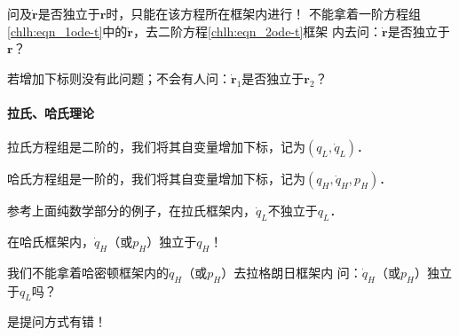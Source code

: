 问及$\dot{\boldsymbol{r}}$是否独立于$\boldsymbol{r}$时，只能在该方程所在框架内进行！
不能拿着一阶方程组\eqref{chlh:eqn_1ode-t}中的$\dot{\boldsymbol{r}}$，去二阶方程\eqref{chlh:eqn_2ode-t}框架
内去问：$\dot{\boldsymbol{r}}$是否独立于$\boldsymbol{r}$？

若增加下标则没有此问题；不会有人问：$\dot{\boldsymbol{r}}_1$是否独立于$\boldsymbol{r}_2$？



\paragraph{拉氏、哈氏理论}
拉氏方程组是二阶的，我们将其自变量增加下标，记为$(q_L,\dot{q}_L)$．

哈氏方程组是一阶的，我们将其自变量增加下标，记为$(q_H,\dot{q}_H, p_H)$．

参考上面纯数学部分的例子，在拉氏框架内，$\dot{q}_L$不独立于$q_L$．

在哈氏框架内，$\dot{q}_H$（或$p_H$）独立于$q_H$！

我们不能拿着哈密顿框架内的$\dot{q}_H$（或$p_H$）去拉格朗日框架内
问：$\dot{q}_H$（或$p_H$）独立于$q_L$吗？

是提问方式有错！


